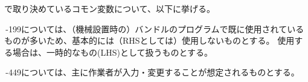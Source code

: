 
\DMname で取り決めているコモン変数について、以下に挙げる。



\,-\pcrNum199については、（機械設置時の）バンドルのプログラムで既に使用されているものが多いため、基本的には（RHSとしては）使用しないものとする。
使用する場合は、一時的なもの(LHS)として扱うものとする。


\,-\pcrNum449については、主に作業者が入力・変更することが想定されるものとする。
